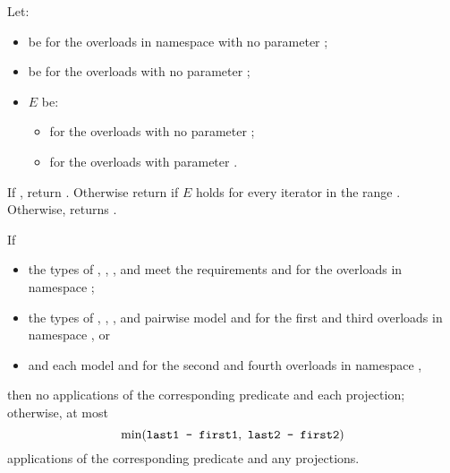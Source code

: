 \begin{itemdescr}
\pnum
Let:
\begin{itemize}
\item
   be 
  for the overloads in namespace  with no parameter ;
\item
   be 
  for the overloads with no parameter ;
\item
  $E$ be:
  \begin{itemize}
  \setlength{\emergencystretch}{1em}
  \item
    for the overloads with no parameter ;
  \item
    for the overloads with parameter .
  \end{itemize}
\end{itemize}

\pnum
\returns
If , return .
Otherwise return 
if $E$ holds for every iterator  in the range .
Otherwise, returns .

\pnum
\complexity
If
\begin{itemize}
\item
  the types of , , , and 
  meet the
   requirements
  and 
  for the overloads in namespace ;
\item
  the types of , , , and 
  pairwise model 
  and 
  for the first and third overloads in namespace , or
\item
    and  each model  and
   for the second and fourth overloads in namespace ,
\end{itemize}
then no applications of the corresponding predicate and each projection;
otherwise, at most
\[ \min(\tcode{last1 - first1}, \ \tcode{last2 - first2}) \]
applications of the corresponding predicate and any projections.
\end{itemdescr}

